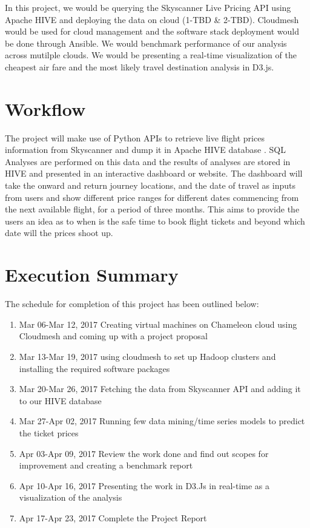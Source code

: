 \documentclass[9pt,twocolumn,twoside]{../../styles/osajnl}
\begin{document}
In this project, we would be querying the Skyscanner Live Pricing API using Apache HIVE and deploying the data on cloud (1-TBD \& 2-TBD). Cloudmesh would be used for cloud management and the software stack deployment would be done through Ansible. We would benchmark performance of our analysis across mutilple clouds. We would be presenting a real-time visualization of the cheapest air fare and the most likely travel destination analysis in D3.js.
\section{Workflow}

The project will make use of Python APIs to retrieve live flight prices information from Skyscanner and dump it in Apache HIVE database \cite{www-hive}. SQL Analyses are performed on this data and the results of analyses are stored in HIVE and presented in an interactive dashboard or website. The dashboard will take the onward and return journey locations, and the date of travel as inputs from users and show different price ranges for different dates commencing from the next available flight, for a period of three months. This aims to provide the users an idea as to when is the safe time to book flight tickets and beyond which date will the prices shoot up. 

\section{Execution Summary}
The schedule for completion of this project has been outlined below:
\begin{enumerate}
\item {Mar 06-Mar 12, 2017} Creating virtual machines on Chameleon cloud using Cloudmesh and coming up with a project proposal
\item {Mar 13-Mar 19, 2017} using cloudmesh to set up Hadoop clusters and installing the required software packages
\item {Mar 20-Mar 26, 2017} Fetching the data from Skyscanner API and adding it to our HIVE database
\item {Mar 27-Apr 02, 2017} Running few data mining/time series models to predict the ticket prices
\item {Apr 03-Apr 09, 2017} Review the work done and find out scopes for improvement and creating a benchmark report
\item {Apr 10-Apr 16, 2017} Presenting the work in D3.Js in real-time as a visualization of the analysis 
\item {Apr 17-Apr 23, 2017} Complete the Project Report
\end{enumerate}
\end{document}

